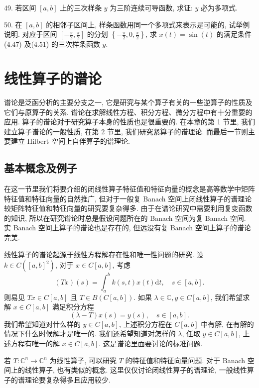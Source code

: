 \documentclass[openany]{ctexbook}
\theoremstyle{kaiti}
\theoremstyle{normal}
\begin{document}
49. 若区间 $[a, b]$ 上的三次样条 $y$ 为三阶连续可导函数, 求证: $y$ 必为多项式.

50. 在 $[a, b]$ 的相邻子区间上, 样条函数用同一个多项式来表示是可能的, 试举例说明. 对应于区间 $\left[-\frac{\pi}{2}, \frac{\pi}{2}\right]$ 的分划 $\left\{-\frac{\pi}{2}, 0, \frac{\pi}{2}\right\}$, 求 $x(t)=\sin (t)$ 的满足条件 (4.47) 及(4.51) 的三次样条函数 $y$.

\chapter{线性算子的谱论}

谱论是泛函分析的主要分支之一, 它是研究与某个算子有关的一些逆算子的性质及它们与原算子的关系. 谱论在求解线性方程、积分方程、微分方程中有十分重要的应用. 算子的谱论对于研究算子本身的性质也是很重要的. 在本章的第 1 节里, 我们建立算子谱论的一般性质, 在第 2 节里, 我们研究紧算子的谱理论. 而最后一节则主要建立 Hilbert 空间上自伴算子的谱理论.

\section{基本概念及例子}

在这一节里我们将要介绍的闭线性算子特征值和特征向量的概念是高等数学中矩阵特征值和特征向量的自然推广, 但对于一般复 Banach 空间上闭线性算子的谱理论较矩阵特征值和特征向量的研究要复杂得多. 由于在谱论研究中需要利用复变函数的知识, 所以在研究谱论时总是假设问题所在的 Banach 空间为复 Banach 空间. 实 Banach 空间上算子的谱论也是存在的, 但远没有复 Banach 空间上算子的谱论完美.

线性算子的谱论起源于线性方程解存在性和唯一性问题的研究. 设 $k \in C\left([a, b]^2\right)$, 对于 $x \in C[a, b]$, 考虑
$$
(T x)(s)=\int_{a}^{b} k(s, t) x(t) \mathrm{d} t, \quad s \in[a, b].
$$
则易见 $T x \in C[a, b]$ 且 $T \in B(C[a, b])$. 如果 $\lambda \in \mathbb{C}, y \in C[a, b]$, 我们希望求解 $x \in C[a, b]$ 满足积分方程
$$
(\lambda-T) x(s)=y(s), \quad s \in[a, b].
$$
我们希望知道对什么样的 $y \in C[a, b]$, 上述积分方程在 $C[a, b]$ 中有解, 在有解的情况下什么时候解才是唯一的. 我们还希望知道对怎样的 $\lambda$, 任取 $y \in C[a, b]$, 上述方程有唯一的解 $x \in C[a, b]$. 这是谱论里面要讨论的标准问题.

若 $T: \mathbb{C}^n \rightarrow \mathbb{C}^n$ 为线性算子, 可以研究 $T$ 的特征值和特征向量问题. 对于 Banach 空间上的线性算子, 也有类似的概念. 这里仅仅讨论闭线性算子的谱理论, 一般线性算子的谱理论要复杂得多且应用较少.
\end{document}
